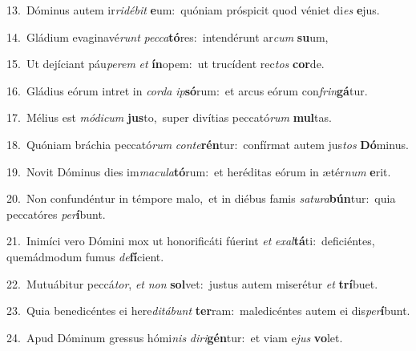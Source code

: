 {\numbfont\textcolor{\numbcolor}{13.}}~Dóminus autem ir\-\textit{ri}\-\textit{dé}\textit{bit} \textbf{e}\-um:~\star quóniam próspicit quod véniet di\textit{es} \textbf{e}\-jus.\par
{\numbfont\textcolor{\numbcolor}{14.}}~Gládium evaginavé\textit{runt} \textit{pec}\-\textit{ca}\textbf{tó}res:~\star intendérunt ar\textit{cum} \textbf{su}\-um,\par
{\numbfont\textcolor{\numbcolor}{15.}}~Ut dejíciant páu\-\textit{pe}\-\textit{rem} \textit{et} \textbf{ín}\-opem:~\star ut trucídent rec\textit{tos} \textbf{cor}\-de.\par
{\numbfont\textcolor{\numbcolor}{16.}}~Gládius eórum intret in \textit{cor}\-\textit{da} \textit{ip}\-\textbf{só}rum:~\star et arcus eórum con\-\textit{frin}\-\textbf{gá}tur.\par
{\numbfont\textcolor{\numbcolor}{17.}}~Mélius est \textit{mó}\-\textit{di}\textit{cum} \textbf{jus}\-to,~\star super divítias peccató\textit{rum} \textbf{mul}\-tas.\par
{\numbfont\textcolor{\numbcolor}{18.}}~Quóniam bráchia peccató\textit{rum} \textit{con}\-\textit{te}\textbf{rén}tur:~\star confírmat autem jus\textit{tos} \textbf{Dó}\-minus.\par
{\numbfont\textcolor{\numbcolor}{19.}}~Novit Dóminus dies im\-\textit{ma}\-\textit{cu}\textit{la}\textbf{tó}rum:~\star et heréditas eórum in ætér\textit{num} \textbf{e}\-rit.\par
{\numbfont\textcolor{\numbcolor}{20.}}~Non confundéntur in témpore malo,~\dagger et in diébus famis \textit{sa}\-\textit{tu}\textit{ra}\textbf{bún}tur:~\star quia peccatóres \textit{per}\-\textbf{í}bunt.\par
{\numbfont\textcolor{\numbcolor}{21.}}~Inimíci vero Dómini mox ut honorificáti fúerint \textit{et} \textit{ex}\-\textit{al}\textbf{tá}ti:~\star deficiéntes, quemádmodum fumus \textit{de}\-\textbf{fí}cient.\par
{\numbfont\textcolor{\numbcolor}{22.}}~Mutuábitur peccá\-\textit{tor}\-, \textit{et} \textit{non} \textbf{sol}\-vet:~\star justus autem miserétur \textit{et} \textbf{trí}\-buet.\par
{\numbfont\textcolor{\numbcolor}{23.}}~Quia benedicéntes ei here\-\textit{di}\-\textit{tá}\textit{bunt} \textbf{ter}\-ram:~\star maledicéntes autem ei dis\-\textit{per}\-\textbf{í}bunt.\par
{\numbfont\textcolor{\numbcolor}{24.}}~Apud Dóminum gressus hómi\textit{nis} \textit{di}\-\textit{ri}\textbf{gén}tur:~\star et viam e\textit{jus} \textbf{vo}\-let.\par
